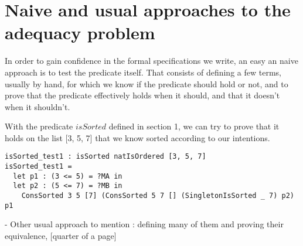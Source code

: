 \section{Naive and usual approaches to the adequacy problem}


In order to gain confidence in the formal specifications we write, an easy an naive approach is to test the predicate itself. That consists of defining a few terms, usually by hand, for which we know if the predicate should hold or not, and to prove that the predicate effectively holds when it should, and that it doesn't when it shouldn't.

With the predicate $isSorted$ defined in section 1, we can try to prove that it holds on the list [3, 5, 7] that we know sorted according to our intentions.

\begin{lstlisting}
isSorted_test1 : isSorted natIsOrdered [3, 5, 7]
isSorted_test1 = 
  let p1 : (3 <= 5) = ?MA in
  let p2 : (5 <= 7) = ?MB in
    ConsSorted 3 5 [7] (ConsSorted 5 7 [] (SingletonIsSorted _ 7) p2) p1

\end{lstlisting}





- Other usual approach to mention : defining many of them and proving their equivalence,
[quarter of a page]



